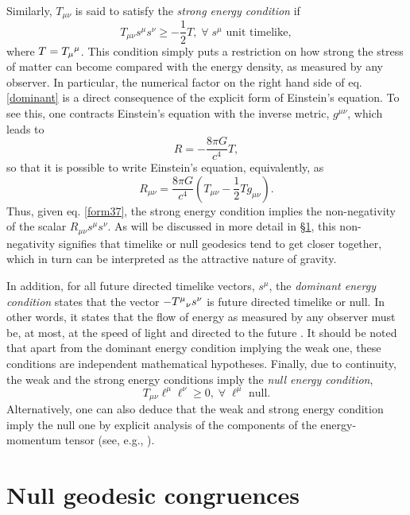 \documentclass[
12pt,		%
openright,	%
twoside,  %
a4paper,			%
chapter=TITLE,		%
english,			%
french,				%
spanish,			%
brazil				%
]{USPSC-classe/USPSC}
\begin{document}
Similarly, $T_{\mu\nu}$ is said to satisfy the \textit{strong energy condition} if
\begin{equation}\label{dominant}
    T_{\mu\nu}s^{\mu}s^{\nu}\geq -\frac{1}{2}T,\;\forall\;s^{\mu}\text{ unit timelike},
\end{equation}
where $T=T_{\mu}\mathstrut^{\mu}$. This condition simply puts a restriction on how strong the stress of matter can become compared with the energy density, as measured by any observer. In particular, the numerical factor on the right hand side of eq. \ref{dominant} is a direct consequence of the explicit form of Einstein's equation. To see this, one contracts Einstein's equation with the inverse metric, $g^{\mu\nu}$, which leads to 
\begin{equation}
    R=-\frac{8\pi G}{c^4}T,
\end{equation}
so that it is possible to write Einstein's equation, equivalently, as
\begin{equation}\label{form37}
    R_{\mu\nu}=\frac{8\pi G}{c^4}\left(T_{\mu\nu}-\frac{1}{2}Tg_{\mu\nu}\right).
\end{equation}
Thus, given eq. \ref{form37}, the strong energy condition implies the non-negativity of the scalar $R_{\mu\nu}s^{\mu}s^{\nu}$. As will be discussed in more detail in \S\;\ref{null}, this non-negativity signifies that timelike or null geodesics tend to get closer together, which in turn can be interpreted as the attractive nature of gravity.

In addition, for all future directed timelike vectors, $s^{\mu}$, the \textit{dominant energy condition} states that the vector $-T^{\mu}\mathstrut_{\nu}s^{\nu}$ is future directed timelike or null. In other words, it states that the flow of energy as measured by any observer must be, at most, at the speed of light and directed to the future \cite{Wald1984}. It should be noted that apart from the dominant energy condition implying the weak one, these conditions are independent mathematical hypotheses. Finally, due to continuity, the weak and the strong energy conditions imply the \textit{null energy condition},
\begin{equation}
    T_{\mu\nu}\ell^{\mu}\ell^{\nu}\geq 0,\;\forall\;\ell^{\mu}\text{ null}.
\end{equation}
Alternatively, one can also deduce that the weak and strong energy condition imply the null one by explicit analysis of the components of the energy-momentum tensor (see, e.g., \cite{Poisson2004}).

\section{Null geodesic congruences}\label{null}
\end{document}
